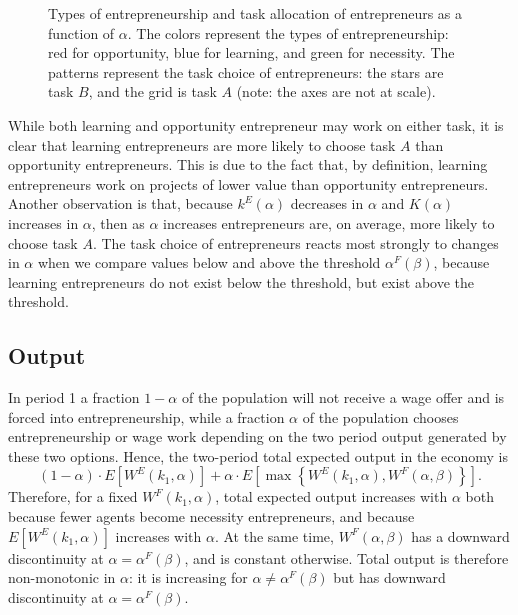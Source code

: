 \documentclass[12pt,american]{paper}
\theoremstyle{remark}
\begin{document}
\begin{figure}
\begin{tikzpicture}[thick,scale=1, every node/.style={scale=1.1}]



\end{tikzpicture}
    \caption{Types of entrepreneurship and task allocation of entrepreneurs as a function of $\alpha$. The colors represent the types of entrepreneurship: red for opportunity, blue for learning, and green for necessity. The patterns represent the task choice of entrepreneurs: the stars are task $B$, and the grid is task $A$ (note: the axes are not at scale).}
    \label{fig:types_of_entrepreneurship}
\end{figure}

While both learning and opportunity entrepreneur may work on either task, it is clear that learning entrepreneurs are more likely to choose task $A$ than opportunity entrepreneurs. This is due to the fact that, by definition, learning entrepreneurs work on projects of lower value than opportunity entrepreneurs. Another observation is that, because $k^E(\alpha)$ decreases in $\alpha$ and $K(\alpha)$ increases in $\alpha$, then as $\alpha$ increases entrepreneurs are, on average, more likely to choose task $A$. The task choice of entrepreneurs reacts most strongly to changes in $\alpha$ when we compare values below and above the threshold $\alpha^F(\beta)$, because learning entrepreneurs do not exist  below the threshold, but exist  above the threshold.


\subsection{Output}
In period 1 a fraction $1-\alpha$ of the population will not receive a wage offer and is forced into entrepreneurship, while a fraction $\alpha$ of the population chooses entrepreneurship or wage work depending on the two period output generated by these two options. Hence, the two-period total expected output in the economy is
\[
(1-\alpha) \cdot E[W^E(k_1,\alpha)] + \alpha \cdot E[ \max\left\lbrace W^E(k_1,\alpha), W^F(\alpha,\beta) \right\rbrace ].
\]
Therefore, for a fixed $W^F(k_1,\alpha)$, total expected output increases with $\alpha$ both because fewer agents become necessity entrepreneurs, and because $E[W^E(k_1,\alpha)]$ increases with $\alpha$. At the same time, $W^F(\alpha,\beta)$ has a downward discontinuity at $\alpha=\alpha^F(\beta)$, and is constant otherwise.  Total output is therefore non-monotonic in $\alpha$: it is increasing for $\alpha \neq \alpha^F(\beta)$ but has downward discontinuity at $\alpha=\alpha^F(\beta)$.
\end{document}
